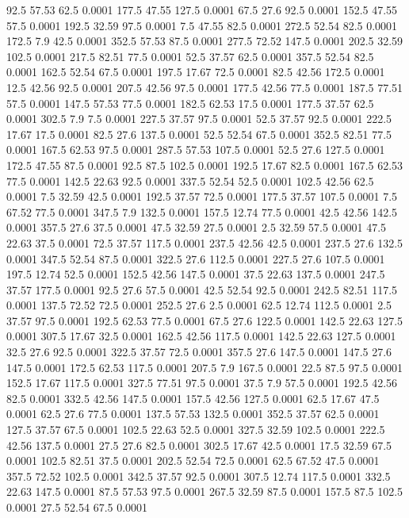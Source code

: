 92.5	57.53	62.5	0.0001
177.5	47.55	127.5	0.0001
67.5	27.6	92.5	0.0001
152.5	47.55	57.5	0.0001
192.5	32.59	97.5	0.0001
7.5	47.55	82.5	0.0001
272.5	52.54	82.5	0.0001
172.5	7.9	42.5	0.0001
352.5	57.53	87.5	0.0001
277.5	72.52	147.5	0.0001
202.5	32.59	102.5	0.0001
217.5	82.51	77.5	0.0001
52.5	37.57	62.5	0.0001
357.5	52.54	82.5	0.0001
162.5	52.54	67.5	0.0001
197.5	17.67	72.5	0.0001
82.5	42.56	172.5	0.0001
12.5	42.56	92.5	0.0001
207.5	42.56	97.5	0.0001
177.5	42.56	77.5	0.0001
187.5	77.51	57.5	0.0001
147.5	57.53	77.5	0.0001
182.5	62.53	17.5	0.0001
177.5	37.57	62.5	0.0001
302.5	7.9	7.5	0.0001
227.5	37.57	97.5	0.0001
52.5	37.57	92.5	0.0001
222.5	17.67	17.5	0.0001
82.5	27.6	137.5	0.0001
52.5	52.54	67.5	0.0001
352.5	82.51	77.5	0.0001
167.5	62.53	97.5	0.0001
287.5	57.53	107.5	0.0001
52.5	27.6	127.5	0.0001
172.5	47.55	87.5	0.0001
92.5	87.5	102.5	0.0001
192.5	17.67	82.5	0.0001
167.5	62.53	77.5	0.0001
142.5	22.63	92.5	0.0001
337.5	52.54	52.5	0.0001
102.5	42.56	62.5	0.0001
7.5	32.59	42.5	0.0001
192.5	37.57	72.5	0.0001
177.5	37.57	107.5	0.0001
7.5	67.52	77.5	0.0001
347.5	7.9	132.5	0.0001
157.5	12.74	77.5	0.0001
42.5	42.56	142.5	0.0001
357.5	27.6	37.5	0.0001
47.5	32.59	27.5	0.0001
2.5	32.59	57.5	0.0001
47.5	22.63	37.5	0.0001
72.5	37.57	117.5	0.0001
237.5	42.56	42.5	0.0001
237.5	27.6	132.5	0.0001
347.5	52.54	87.5	0.0001
322.5	27.6	112.5	0.0001
227.5	27.6	107.5	0.0001
197.5	12.74	52.5	0.0001
152.5	42.56	147.5	0.0001
37.5	22.63	137.5	0.0001
247.5	37.57	177.5	0.0001
92.5	27.6	57.5	0.0001
42.5	52.54	92.5	0.0001
242.5	82.51	117.5	0.0001
137.5	72.52	72.5	0.0001
252.5	27.6	2.5	0.0001
62.5	12.74	112.5	0.0001
2.5	37.57	97.5	0.0001
192.5	62.53	77.5	0.0001
67.5	27.6	122.5	0.0001
142.5	22.63	127.5	0.0001
307.5	17.67	32.5	0.0001
162.5	42.56	117.5	0.0001
142.5	22.63	127.5	0.0001
32.5	27.6	92.5	0.0001
322.5	37.57	72.5	0.0001
357.5	27.6	147.5	0.0001
147.5	27.6	147.5	0.0001
172.5	62.53	117.5	0.0001
207.5	7.9	167.5	0.0001
22.5	87.5	97.5	0.0001
152.5	17.67	117.5	0.0001
327.5	77.51	97.5	0.0001
37.5	7.9	57.5	0.0001
192.5	42.56	82.5	0.0001
332.5	42.56	147.5	0.0001
157.5	42.56	127.5	0.0001
62.5	17.67	47.5	0.0001
62.5	27.6	77.5	0.0001
137.5	57.53	132.5	0.0001
352.5	37.57	62.5	0.0001
127.5	37.57	67.5	0.0001
102.5	22.63	52.5	0.0001
327.5	32.59	102.5	0.0001
222.5	42.56	137.5	0.0001
27.5	27.6	82.5	0.0001
302.5	17.67	42.5	0.0001
17.5	32.59	67.5	0.0001
102.5	82.51	37.5	0.0001
202.5	52.54	72.5	0.0001
62.5	67.52	47.5	0.0001
357.5	72.52	102.5	0.0001
342.5	37.57	92.5	0.0001
307.5	12.74	117.5	0.0001
332.5	22.63	147.5	0.0001
87.5	57.53	97.5	0.0001
267.5	32.59	87.5	0.0001
157.5	87.5	102.5	0.0001
27.5	52.54	67.5	0.0001
